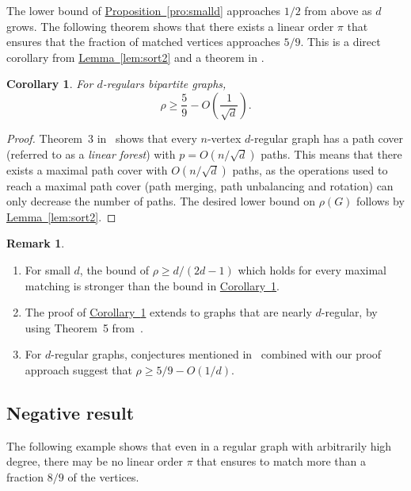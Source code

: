 \documentclass[11pt]{article}
\numberwithin{equation}{section}
\newtheorem{corollary}[theorem]{Corollary}
\theoremstyle{definition}
\newtheorem{remark}[theorem]{Remark}
\theoremstyle{plain}
\newcommand{\expref}[2]{\hyperref[#2]{#1~\ref{#2}}}
\theoremstyle{plain}
\begin{document}
The lower bound of \expref{Proposition}{pro:smalld} approaches
%
%
$1/2$ from above as $d$ grows.  
The following theorem shows that there exists %
%
%
%
%
a   %
linear order $\pi$ that ensures that the fraction of matched vertices approaches $5/9$.
This is a direct corollary from \expref{Lemma}{lem:sort2} and a theorem in \cite{FeigeRS14}.

%
\begin{corollary}
	\label{cor:regular}
	For $d$-regulars bipartite graphs, 
$$\rho \ge \frac{5}{9} - O\left(\frac{1}{\sqrt{d}}\right).$$	
\end{corollary}

\begin{proof}
  Theorem~3 in~\cite{FeigeRS14} shows that every $n$-vertex $d$-regular graph has a path cover (referred to as a \emph{linear forest}) with  $p = O(n/\sqrt{d})$ paths. This means that there exists a maximal path cover with $O(n/\sqrt{d})$ paths, as the operations used to reach a maximal path cover (path merging, path unbalancing and rotation) can only decrease the number of paths.
%
%
The desired lower bound on $\rho(G)$ follows by \expref{Lemma}{lem:sort2}. %
%
%
%
\end{proof}

\begin{remark}
\begin{enumerate}
	
	\item For small $d$, the bound of $\rho \ge d/(2d - 1)$ which holds for every maximal matching is stronger than the bound in \expref{Corollary}{cor:regular}.
	
	\item The proof of \expref{Corollary}{cor:regular} extends to graphs that are nearly $d$-regular, by using Theorem~5 from~\cite{FeigeRS14}.
	
	\item For $d$-regular graphs, conjectures mentioned in~\cite{FeigeRS14} combined with our proof approach suggest that $\rho \ge 5/9 - O(1/d)$.
	
\end{enumerate}
\end{remark}

\subsection{Negative result}
\label{sec:regular-neg}

The following example shows that even in a regular graph with arbitrarily high degree, there may be no linear order $\pi$ that ensures to match more than a fraction $8/9$ of the vertices.
\end{document}
